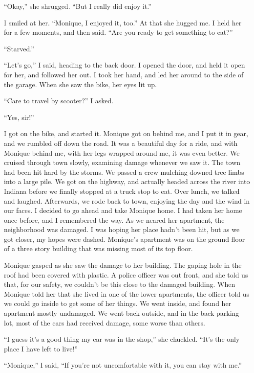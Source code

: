 ``Okay,'' she shrugged. ``But I really did enjoy it.''

I smiled at her. ``Monique, I enjoyed it, too.'' At that she hugged me. I held her for a
few moments, and then said. ``Are you ready to get something to eat?''

``Starved.''

``Let's go,'' I said, heading to the back door. I opened the door, and held it open for
her, and followed her out. I took her hand, and led her around to the side of the garage. When
she saw the bike, her eyes lit up.

``Care to travel by scooter?'' I asked.

``Yes, sir!''

I got on the bike, and started it. Monique got on behind me, and I put it in gear, and we
rumbled off down the road. It was a beautiful day for a ride, and with Monique behind me, with
her legs wrapped around me, it was even better. We cruised through town slowly, examining damage
whenever we saw it. The town had been hit hard by the storms. We passed a crew mulching downed
tree limbs into a large pile. We got on the highway, and actually headed across the river into
Indiana before we finally stopped at a truck stop to eat. Over lunch, we talked and laughed.
Afterwards, we rode back to town, enjoying the day and the wind in our faces. I decided to go
ahead and take Monique home. I had taken her home once before, and I remembered the way. As we
neared her apartment, the neighborhood was damaged. I was hoping her place hadn't been hit, but
as we got closer, my hopes were dashed. Monique's apartment was on the ground floor of a three
story building that was missing most of its top floor.

Monique gasped as she saw the damage to her building. The gaping hole in the roof had been
covered with plastic. A police officer was out front, and she told us that, for our safety, we
couldn't be this close to the damaged building. When Monique told her that she lived in one of
the lower apartments, the officer told us we could go inside to get some of her things. We went
inside, and found her apartment mostly undamaged. We went back outside, and in the back parking
lot, most of the cars had received damage, some worse than others.

``I guess it's a good thing my car was in the shop,'' she chuckled. ``It's the only place
I have left to live!''

``Monique,'' I said, ``If you're not uncomfortable with it, you can stay with me.''

